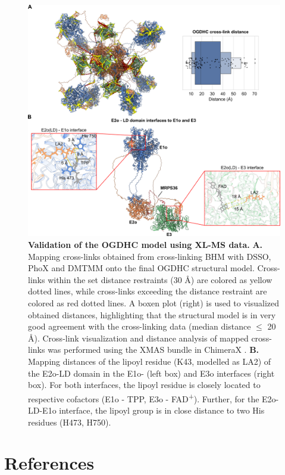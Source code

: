 \begin{subappendices}
    \begin{figure}[hbt!]
        \center
        \includegraphics[width=\textwidth]{Chapter.5/Figures/Figure_S4.png} 
        \caption{\textbf{Validation of the OGDHC model using XL-MS data.} \textbf{A.} Mapping cross-links obtained from cross-linking BHM with DSSO, PhoX and DMTMM onto the final OGDHC structural model. Cross-links within the set distance restraints (30 Å) are colored as yellow dotted lines, while cross-links exceeding the distance restraint are colored as red dotted lines. A boxen plot (right) is used to visualized obtained distances, highlighting that the structural model is in very good agreement with the cross-linking data (median distance $\leq$ 20 Å). Cross-link visualization and distance analysis of mapped cross-links was performed using the XMAS bundle in ChimeraX \cite{Lagerwaard_2022}. \textbf{B.} Mapping distances of the lipoyl residue (K43, modelled as LA2) of the E2o-LD domain in the E1o- (left box) and E3o interfaces (right box). For both interfaces, the lipoyl residue is closely located to respective cofactors (E1o - TPP, E3o - FAD\textsuperscript{+}). Further, for the E2o-LD-E1o interface, the lipoyl group is in close distance to two His residues (H473, H750).}
        \label{fig:ch5_app_fig4}
    \end{figure}

    
\end{subappendices}

\clearpage
\section*{References}


